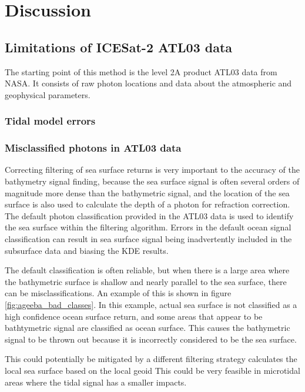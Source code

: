 \chapter{Discussion}


\section{Limitations of ICESat-2 ATL03 data}
The starting point of this method is the level 2A product ATL03 data from NASA. It consists of raw photon locations and data about the atmospheric and geophysical parameters. 

\subsection{Tidal model errors}
\subsection{Misclassified photons in ATL03 data}

Correcting filtering of sea surface returns is very important to the accuracy of the bathymetry signal finding, because the sea surface signal is often several orders of magnitude more dense than the bathymetric signal, and the location of the sea surface is also used to calculate the depth of a photon for refraction correction. The default photon classification provided in the ATL03 data is used to identify the sea surface within the filtering algorithm. Errors in the default ocean signal classification can result in sea surface signal being inadvertently included in the subsurface data and biasing the KDE results.

The default classification is often reliable, but when there is a large area where the bathymetric surface is shallow and nearly parallel to the sea surface, there can be misclassifications. An example of this is shown in figure \ref{fig:ageeba_bad_classes}. In this example, actual sea surface is not classified as a high confidence ocean surface return, and some areas that appear to be bathtymetric signal are classified as ocean surface. This causes the bathymetric signal to be thrown out because it is incorrectly considered to be the sea surface.

This could potentially be mitigated by a different filtering strategy calculates the local sea surface based on the local geoid  This could be very feasible in microtidal areas where the tidal signal has a smaller impacts.

